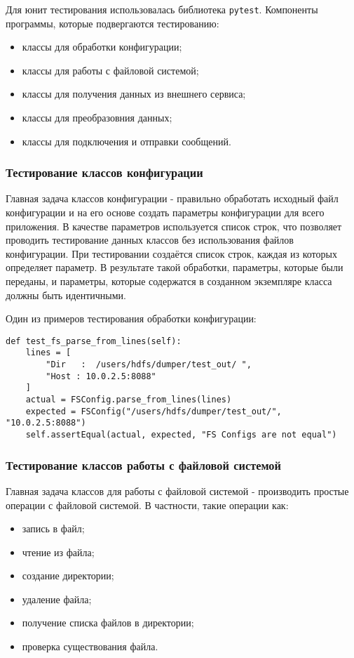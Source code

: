 Для юнит тестирования использовалась библиотека \texttt{pytest}.
Компоненты программы, которые подвергаются тестированию:
\begin{itemize}
    \item классы для обработки конфигурации;
    \item классы для работы с файловой системой;
    \item классы для получения данных из внешнего сервиса;
    \item классы для преобразовния данных;
    \item классы для подключения и отправки сообщений.
\end{itemize}

\subsubsection{Тестирование классов конфигурации}

Главная задача классов конфигурации - правильно обработать исходный файл конфигурации и на его основе создать параметры конфигурации для всего приложения.
В качестве параметров используется список строк, что позволяет проводить тестирование данных классов без использования файлов конфигурации.
При тестировании создаётся список строк, каждая из которых определяет параметр.
В результате такой обработки, параметры, которые были переданы, и параметры, которые содержатся в созданном экземпляре класса должны быть идентичными.

Один из примеров тестирования обработки конфигурации:
\begin{lstlisting}
def test_fs_parse_from_lines(self):
    lines = [
        "Dir   :  /users/hdfs/dumper/test_out/ ",
        "Host : 10.0.2.5:8088"
    ]
    actual = FSConfig.parse_from_lines(lines)
    expected = FSConfig("/users/hdfs/dumper/test_out/", "10.0.2.5:8088")
    self.assertEqual(actual, expected, "FS Configs are not equal")
\end{lstlisting}

\subsubsection{Тестирование классов работы с файловой системой}

Главная задача классов для работы с файловой системой - производить простые операции с файловой системой.
В частности, такие операции как:
\begin{itemize}
    \item запись в файл;
    \item чтение из файла;
    \item создание директории;
    \item удаление файла;
    \item получение списка файлов в директории;
    \item проверка существования файла.
\end{itemize}

